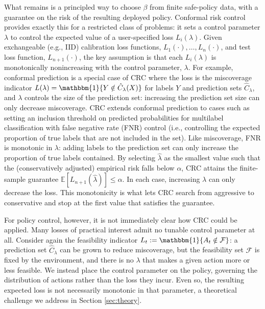 What remains is a principled way to choose $\beta$ from finite safe-policy data, with a guarantee on the risk of the resulting deployed policy.
Conformal risk control \citep[CRC;][]{angelopoulos2022conformal} provides exactly this for a restricted class of problems: it sets a control parameter $\lambda$ to control the expected value of a user-specified loss $L_i(\lambda)$.
Given exchangeable (e.g., IID) calibration loss functions, $L_1(\cdot), \ldots, L_n(\cdot)$, and test loss function, $L_{n+1}(\cdot)$, the key assumption is that each $L_i(\lambda)$ is monotonically nonincreasing with the control parameter, $\lambda$.
For example, conformal prediction \citep{vovk2005algorithmic} is a special case of CRC where the loss is the miscoverage indicator $L(\lambda) = \mathbbm{1}\{Y \notin \hat{C}_{\lambda}(X)\}$ for labels $Y$ and prediction sets $\hat C_\lambda$, and $\lambda$ controls the size of the prediction set: increasing the prediction set size can only decrease miscoverage.
CRC extends conformal prediction to cases such as setting an inclusion threshold on predicted probabilities for multilabel classification with false negative rate (FNR) control (i.e., controlling the expected proportion of true labels that are not included in the set). Like miscoverage, FNR is monotonic in $\lambda$: adding labels to the prediction set can only increase the proportion of true labels contained. 
By selecting $\hat{\lambda}$ as the smallest value such that the (conservatively adjusted) empirical risk falls below $\alpha$, CRC attains the finite-sample guarantee $\mathbb{E}[L_{n+1}(\hat{\lambda})] \leq \alpha$.
In each case, increasing $\lambda$ can only decrease the loss. This monotonicity is what lets CRC search from aggressive to conservative and stop at the first value that satisfies the guarantee.

  For policy control, however, it is not immediately clear how CRC could be applied.
  Many losses of practical interest admit no tunable control parameter at all.
  Consider again the feasibility indicator $L_t := \mathbbm{1}\{A_t \notin \mathcal{F}\}$: a prediction set $\hat{C}_{\lambda}$ can be grown to reduce miscoverage, but the feasibility set $\mathcal{F}$ is fixed by the environment, and there is no $\lambda$ that makes a given action more or less feasible.
  We instead place the control parameter on the policy, governing the distribution of actions rather than the loss they incur.
  Even so, the resulting expected loss is not necessarily monotonic in that parameter, a theoretical challenge we address in Section \ref{sec:theory}.


